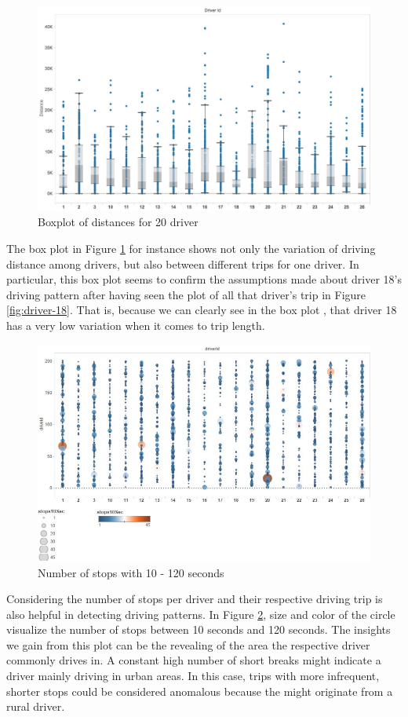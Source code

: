 \documentclass{vldb}
\begin{document}
\begin{figure}
\centering
\includegraphics[width=\linewidth]{"pics/box-plot-distance"}%
\caption{Boxplot of distances for 20 driver}
\label{fig:box-plot-distance}
\end{figure}
The box plot in Figure \ref{fig:box-plot-distance} for instance shows not only the variation of driving distance among drivers, but also between different trips for one driver.  In particular, this box plot seems to confirm the assumptions made about driver 18's driving pattern after having seen the plot of all that driver's trip in Figure \ref{fig:driver-18}. That is, because we can clearly see in the box plot , that driver 18 has a very low variation when it comes to trip length. 

\begin{figure}
\centering
\includegraphics[width=\linewidth]{"pics/number-of-breaks-10-120"}%
\caption{Number of stops with 10 - 120 seconds}
\label{fig:number-of-breaks-10-120}
\end{figure}
Considering the number of stops per driver and their respective driving trip is also helpful in detecting driving patterns. In Figure \ref{fig:number-of-breaks-10-120}, size and color of the circle visualize the number of stops between 10 seconds and 120 seconds. The insights we gain from this plot can be the revealing of the area the respective driver commonly drives in. A constant high number of short breaks might indicate a driver mainly driving in urban areas. In this case, trips with more infrequent, shorter stops could be considered anomalous because the might originate from a rural driver.
\end{document}

